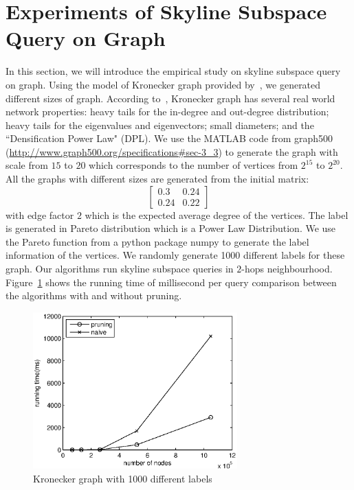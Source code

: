 \section{Experiments of Skyline Subspace Query on Graph}
\label{ch:exp:graph}
In this section, we will introduce the empirical study on skyline subspace query on graph.
Using the model of Kronecker graph provided by~\cite{leskovec2005realistic}, we generated different sizes of graph.
According to~\cite{leskovec2005realistic}, Kronecker graph has several real world network properties:
heavy tails for the in-degree and out-degree distribution;
heavy tails for the eigenvalues and eigenvectors;
small diameters; and the ``Densification Power Law" (DPL).
We use the MATLAB code from graph500 (\url{http://www.graph500.org/specifications#sec-3_3}) to generate the graph with scale from $15$ to $20$ which corresponds to the number of vertices from $2^{15}$ to $2^{20}$. All the graphs with different sizes are generated from the initial matrix:
\begin{equation}
\begin{bmatrix}
0.3 & 0.24\\ 
0.24 & 0.22
\end{bmatrix}
\end{equation}
with edge factor $2$ which is the expected average degree of the vertices. The label is generated in Pareto distribution which is a Power Law Distribution. We use the Pareto function from a python package numpy to generate the label information of the vertices. We randomly generate 1000 different labels for these graph. Our algorithms run skyline subspace queries in $2$-hops neighbourhood. Figure~\ref{fig:exp:kronecker} shows the running time of millisecond per query comparison between the algorithms with and without pruning.

\begin{figure}[h]
    \centering
      \includegraphics[width=0.7\textwidth]{figs/kronecker}
    \caption{Kronecker graph with 1000 different labels}
    \label{fig:exp:kronecker}
\end{figure}

